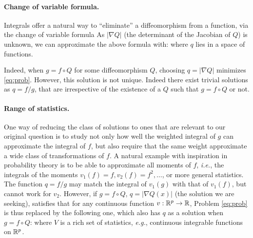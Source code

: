 \paragraph{Change of variable formula.} Integrals offer a natural way to ``eliminate'' a diffeomorphism from a function, via the change of variable formula
As $|\nabla Q|$ (the determinant of the Jacobian of $Q$) is unknown, we can approximate the above formula with:
 where $q$ lies in a space of functions.

Indeed, when $g = f\circ Q$ for some diffeomorphism $Q$, choosing $q = \vert\nabla Q\vert$ minimizes \eqref{eq:prob}. However, this solution is not unique. Indeed there exist trivial solutions as $q = f / g$, that are irrespective of the existence of a $Q$ such that $g=f\circ Q$ or not.

\paragraph{Range of statistics.} One way of reducing the class of solutions to ones that are relevant to our original question is to study not only how well the weighted integral of $g$ can approximate the integral of $f$, but also require that the same weight approximate a wide class of transformations of $f$. A natural example with inspiration in probability theory is to be able to approximate all moments of $f$, \emph{i.e.}, the integrals of the moments $v_1(f) = f, v_2(f) = f^2, \dots$, or more general statistics. The function $q = f / g$ may match the integral of $v_1(g)$ with that of $v_1(f)$, but cannot work for $v_2$. However, if $g = f\circ Q$, $q = |\nabla Q(x)|$ (the solution we are seeking), satisfies that for any continuous function $v: \mathbb R^p \to \mathbb R$,
Problem \eqref{eq:prob} is thus replaced by the following one, which also has $q$ as a solution when $g = f \circ Q$:
 where $V$ is a rich set of statistics, \emph{e.g.}, continuous integrable functions on $\mathbb R^p$.



